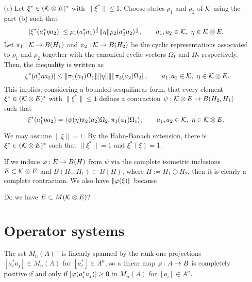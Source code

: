 \documentclass{../../large}
\begin{document}
\begin{pf}
(c)
Let $\xi^*\in(\mathcal{K}\otimes E)^*$ with $\|\xi^*\|\le1$.
Choose states $\rho_1$ and $\rho_2$ of $\mathcal{K}$ using the part (b) such that
\[|\xi^*(a_1^*\eta a_2)|\le\rho_1(a_1^*a_1)^{\frac12}\|\eta\|\rho_2(a_2^*a_2)^{\frac12},\qquad a_1,a_2\in\mathcal{K},\ \eta\in\mathcal{K}\otimes E.\]
Let $\pi_1:\mathcal{K}\to B(H_1)$ and $\pi_2:\mathcal{K}\to B(H_2)$ be the cyclic representations associated to $\rho_1$ and $\rho_2$ together with the canonical cyclic vectors $\Omega_1$ and $\Omega_2$ respectively.
Then, the inequality is written as
\[|\xi^*(a_1^*\eta a_2)|\le\|\pi_1(a_1)\Omega_1\|\|\eta\|\|\|\pi_2(a_2)\Omega_2\|,\qquad a_1,a_2\in\mathcal{K},\ \eta\in\mathcal{K}\otimes E.\]
This implies, considering a bounded sesquilinear form, that every element $\xi^*\in(\mathcal{K}\otimes E)^*$ with $\|\xi^*\|\le1$ defines a contraction $\psi:\mathcal{K}\otimes E\to B(H_2,H_1)$ such that
\[\xi^*(a_1^*\eta a_2)=\langle\psi(\eta)\pi_2(a_2)\Omega_2,\pi_1(a_1)\Omega_1\rangle,\qquad a_1,a_2\in\mathcal{K},\ \eta\in\mathcal{K}\otimes E.\]



We may assume $\|\xi\|=1$.
By the Hahn-Banach extension, there is $\xi^*\in(\mathcal{K}\otimes E)^*$ such that $\|\xi^*\|=1$ and $\xi^*(\xi)=1$.

If we induce $\varphi:E\to B(H)$ from $\psi$ via the complete isometric inclusions $E\subset\mathcal{K}\otimes E$ and $B(H_2,H_1)\subset B(H)$, where $H:=H_1\oplus H_2$, then it is clearly a complete contraction.
We also have $\|\varphi(\xi)\|$ because




Do we have $E\subset M(\mathcal{K}\otimes E)$?
\end{pf}




\section{Operator systems}

\begin{prb}

\end{prb}

\begin{prb}
\end{prb}


The set $M_n(A)^+$ is linearly spanned by the rank-one projections $[a_i^*a_j]\in M_n(A)$ for $[a_i^*]\in A^n$, so a linear map $\varphi:A\to B$ is completely positive if and only if $[\varphi(a_i^*a_j)]\ge0$ in $M_n(A)$ for $[a_i]\in A^n$.
\end{document}
